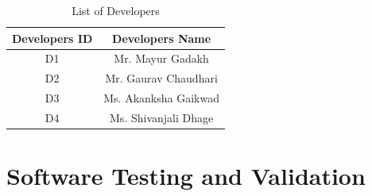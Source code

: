 \documentclass[oneside,a4paper,12pt]{report}
\begin{document}
\begin{table}[!htbp]
\begin{center}

\def\arraystretch{1.5}
  \begin{tabular}{| c | c |}
\hline
Developers ID &	Developers Name  \\
\hline
D1 &	Mr. Mayur Gadakh\\
\hline
D2 &	Mr. Gaurav Chaudhari  \\
 \hline
D3 & Ms. Akanksha Gaikwad\\
 \hline
D4 & Ms. Shivanjali Dhage\\
 \hline
\end{tabular}
 \caption {List of Developers }
 \label{tab:hreq}
\end{center}

\end{table}



\chapter{Software Testing and Validation}
\end{document}
